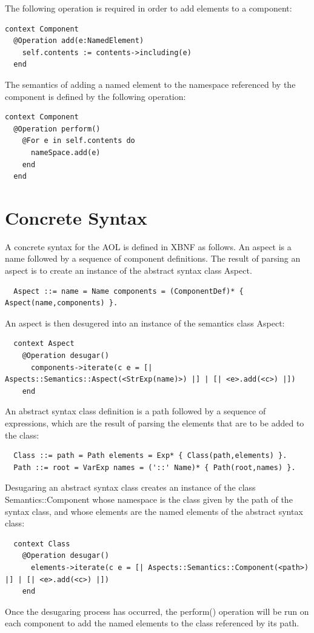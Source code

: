 The following operation is required in order to add elements to a
component:

\begin{lstlisting}
context Component
  @Operation add(e:NamedElement)
    self.contents := contents->including(e)
  end
\end{lstlisting}The semantics of adding a named element to the namespace
referenced by the component is defined by the following operation:

\begin{lstlisting}
context Component
  @Operation perform()
    @For e in self.contents do
      nameSpace.add(e)
    end
  end
\end{lstlisting}\section{Concrete Syntax}

A concrete syntax for the AOL is defined in XBNF as follows. An
aspect is a name followed by a sequence of component definitions.
The result of parsing an aspect is to create an instance of the
abstract syntax class Aspect.

\begin{lstlisting}
  Aspect ::= name = Name components = (ComponentDef)* { Aspect(name,components) }.
\end{lstlisting}An aspect is then desugered into an instance of the semantics
class Aspect:

\begin{lstlisting}
  context Aspect
    @Operation desugar()
      components->iterate(c e = [| Aspects::Semantics::Aspect(<StrExp(name)>) |] | [| <e>.add(<c>) |])
    end
\end{lstlisting}An abstract syntax class definition is a path followed by a
sequence of expressions, which are the result of parsing the
elements that are to be added to the class:

\begin{lstlisting}
  Class ::= path = Path elements = Exp* { Class(path,elements) }.
  Path ::= root = VarExp names = ('::' Name)* { Path(root,names) }.
\end{lstlisting}Desugaring an abstract syntax class creates an instance of the
class Semantics::Component whose namespace is the class given by
the path of the syntax class, and whose elements are the named
elements of the abstract syntax class:

\begin{lstlisting}
  context Class
    @Operation desugar()
      elements->iterate(c e = [| Aspects::Semantics::Component(<path>) |] | [| <e>.add(<c>) |])
    end
\end{lstlisting}Once the desugaring process has occurred, the perform() operation
will be run on each component to add the named elements to the
class referenced by its path.

